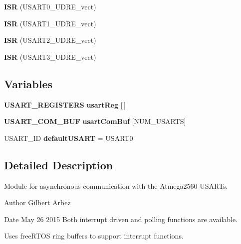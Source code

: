 \begin{DoxyCompactItemize}
\item 
{\bfseries I\+S\+R} (U\+S\+A\+R\+T0\+\_\+\+U\+D\+R\+E\+\_\+vect)\label{group__usart_async_module_ga95e67e677722a53e3ad9f1ffce2e7408}

\item 
{\bfseries I\+S\+R} (U\+S\+A\+R\+T1\+\_\+\+U\+D\+R\+E\+\_\+vect)\label{group__usart_async_module_gad6441110baf548d12ae53fcbed8075c5}

\item 
{\bfseries I\+S\+R} (U\+S\+A\+R\+T2\+\_\+\+U\+D\+R\+E\+\_\+vect)\label{group__usart_async_module_ga6dd0f9b7dad929f4170efd85c67e04ba}

\item 
{\bfseries I\+S\+R} (U\+S\+A\+R\+T3\+\_\+\+U\+D\+R\+E\+\_\+vect)\label{group__usart_async_module_ga965b31b0729ebabd50c26e4557d9609d}

\end{DoxyCompactItemize}
\subsection*{Variables}
\begin{DoxyCompactItemize}
\item 
{\bf U\+S\+A\+R\+T\+\_\+\+R\+E\+G\+I\+S\+T\+E\+R\+S} {\bf usart\+Reg} [$\,$]
\item 
{\bf U\+S\+A\+R\+T\+\_\+\+C\+O\+M\+\_\+\+B\+U\+F} {\bf usart\+Com\+Buf} [N\+U\+M\+\_\+\+U\+S\+A\+R\+T\+S]
\item 
U\+S\+A\+R\+T\+\_\+\+I\+D {\bf default\+U\+S\+A\+R\+T} = U\+S\+A\+R\+T0
\end{DoxyCompactItemize}


\subsection{Detailed Description}
Module for asynchronous communication with the Atmega2560 U\+S\+A\+R\+T\textquotesingle{}s. 

\begin{DoxyAuthor}{Author}
Gilbert Arbez 
\end{DoxyAuthor}
\begin{DoxyDate}{Date}
May 26 2015 Both interrupt driven and polling functions are available.
\end{DoxyDate}
Uses free\+R\+T\+O\+S ring buffers to support interrupt functions. 